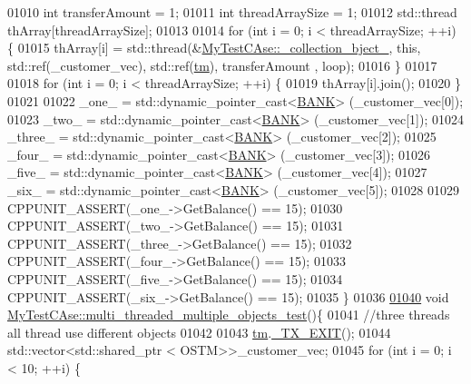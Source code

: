 \begin{DoxyCode}
01010     \textcolor{keywordtype}{int} transferAmount = 1;
01011     \textcolor{keywordtype}{int} threadArraySize = 1; 
01012     std::thread thArray[threadArraySize];
01013 
01014     \textcolor{keywordflow}{for} (\textcolor{keywordtype}{int} i = 0; i < threadArraySize; ++i) \{ 
01015         thArray[i] = std::thread(&\hyperlink{class_my_test_c_ase_a9ec1ddfc6e7f727446e1a8355086c2dd_a9ec1ddfc6e7f727446e1a8355086c2dd}{MyTestCAse::\_collection\_bject\_}, \textcolor{keyword}{this}, 
      std::ref(\_customer\_vec),  std::ref(\hyperlink{class_my_test_c_ase_a422e6e5d4ddedea384be96031c89b72b_a422e6e5d4ddedea384be96031c89b72b}{tm}), transferAmount , loop);
01016     \}
01017     
01018     \textcolor{keywordflow}{for} (\textcolor{keywordtype}{int} i = 0; i < threadArraySize; ++i) \{
01019         thArray[i].join();
01020     \}
01021     
01022     \_one\_ = std::dynamic\_pointer\_cast<\hyperlink{class_b_a_n_k}{BANK}> (\_customer\_vec[0]);
01023     \_two\_ = std::dynamic\_pointer\_cast<\hyperlink{class_b_a_n_k}{BANK}> (\_customer\_vec[1]);
01024     \_three\_ = std::dynamic\_pointer\_cast<\hyperlink{class_b_a_n_k}{BANK}> (\_customer\_vec[2]);
01025     \_four\_ = std::dynamic\_pointer\_cast<\hyperlink{class_b_a_n_k}{BANK}> (\_customer\_vec[3]);
01026     \_five\_ = std::dynamic\_pointer\_cast<\hyperlink{class_b_a_n_k}{BANK}> (\_customer\_vec[4]);
01027     \_six\_ = std::dynamic\_pointer\_cast<\hyperlink{class_b_a_n_k}{BANK}> (\_customer\_vec[5]);
01028     
01029     CPPUNIT\_ASSERT(\_one\_->GetBalance() == 15);
01030     CPPUNIT\_ASSERT(\_two\_->GetBalance() == 15);
01031     CPPUNIT\_ASSERT(\_three\_->GetBalance() == 15);
01032     CPPUNIT\_ASSERT(\_four\_->GetBalance() == 15);
01033     CPPUNIT\_ASSERT(\_five\_->GetBalance() == 15);
01034     CPPUNIT\_ASSERT(\_six\_->GetBalance() == 15);
01035 \}
01036 
\hypertarget{_my_test_c_ase_8cpp_source.tex_l01040}{}\hyperlink{class_my_test_c_ase_ae49b83ddf0fa297dbb8639001644fa5c_ae49b83ddf0fa297dbb8639001644fa5c}{01040} \textcolor{keywordtype}{void} \hyperlink{class_my_test_c_ase_ae49b83ddf0fa297dbb8639001644fa5c_ae49b83ddf0fa297dbb8639001644fa5c}{MyTestCAse::multi\_threaded\_multiple\_objects\_test}()\{
01041     \textcolor{comment}{//three threads all thread use different objects }
01042 
01043     \hyperlink{class_my_test_c_ase_a422e6e5d4ddedea384be96031c89b72b_a422e6e5d4ddedea384be96031c89b72b}{tm}.\hyperlink{class_t_m_a5e2d1127f2429f2f524d25f430eade06_a5e2d1127f2429f2f524d25f430eade06}{\_TX\_EXIT}();
01044     std::vector<std::shared\_ptr < OSTM>>\_customer\_vec; 
01045      \textcolor{keywordflow}{for} (\textcolor{keywordtype}{int} i = 0; i < 10; ++i) \{

\end{DoxyCode}
